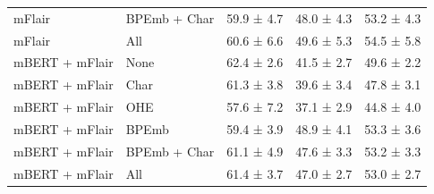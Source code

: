 \documentclass[12pt,a4paper,]{book}
\begin{document}
\begin{longtable}[t]{lllll}
\hspace{1em}mFlair & BPEmb + Char & 59.9 ±  4.7 & 48.0 ±  4.3 & 53.2 ±  4.3\\
\hspace{1em}mFlair & All & 60.6 ±  6.6 & 49.6 ±  5.3 & 54.5 ±  5.8\\
\hspace{1em}mBERT + mFlair & None & 62.4 ±  2.6 & 41.5 ±  2.7 & 49.6 ±  2.2\\
\hspace{1em}mBERT + mFlair & Char & 61.3 ±  3.8 & 39.6 ±  3.4 & 47.8 ±  3.1\\
\hspace{1em}mBERT + mFlair & OHE & 57.6 ±  7.2 & 37.1 ±  2.9 & 44.8 ±  4.0\\
\hspace{1em}mBERT + mFlair & BPEmb & 59.4 ±  3.9 & 48.9 ±  4.1 & 53.3 ±  3.6\\
\hspace{1em}mBERT + mFlair & BPEmb + Char & 61.1 ±  4.9 & 47.6 ±  3.3 & 53.2 ±  3.3\\
\hspace{1em}mBERT + mFlair & All & 61.4 ±  3.7 & 47.0 ±  2.7 & 53.0 ±  2.7\\*
\end{longtable}
\endgroup{}
\newpage

\begingroup\fontsize{10}{12}\selectfont
\end{document}
